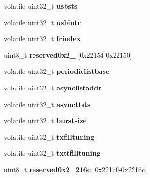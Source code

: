 \begin{DoxyCompactItemize}
volatile uint32\+\_\+t {\bfseries usbsts}
\item 
\mbox{\label{structm83xxUSB__MPHRegisters___aa40fd346ef2c84c0105138f00020142f}} 
volatile uint32\+\_\+t {\bfseries usbintr}
\item 
\mbox{\label{structm83xxUSB__MPHRegisters___a0925a3b8d3aa6941909ec92b1c290482}} 
volatile uint32\+\_\+t {\bfseries frindex}
\item 
\mbox{\label{structm83xxUSB__MPHRegisters___a0333be2defb4c470a48b82ab8dc39a19}} 
uint8\+\_\+t {\bfseries reserved0x2\+\_} \mbox{[}0x22154-\/0x22150\mbox{]}
\item 
\mbox{\label{structm83xxUSB__MPHRegisters___a9642fd5bbe981586fe576dc9b44e299c}} 
volatile uint32\+\_\+t {\bfseries periodiclistbase}
\item 
\mbox{\label{structm83xxUSB__MPHRegisters___ae2a682109aa03a91ac9bcbf3357b16f9}} 
volatile uint32\+\_\+t {\bfseries asynclistaddr}
\item 
\mbox{\label{structm83xxUSB__MPHRegisters___a570808c809a8ab45852a6d643c5ee248}} 
volatile uint32\+\_\+t {\bfseries asyncttsts}
\item 
\mbox{\label{structm83xxUSB__MPHRegisters___a130a21492a0b9117d515d3b1106c3e9d}} 
volatile uint32\+\_\+t {\bfseries burstsize}
\item 
\mbox{\label{structm83xxUSB__MPHRegisters___a445622cebf79ec413521493b7e080e45}} 
volatile uint32\+\_\+t {\bfseries txfilltuning}
\item 
\mbox{\label{structm83xxUSB__MPHRegisters___abff66fbbbd3c0e66ec72c68053d20e3f}} 
volatile uint32\+\_\+t {\bfseries txttfilltuning}
\item 
\mbox{\label{structm83xxUSB__MPHRegisters___a537b0170160c58666c2e817cf896ecc4}} 
uint8\+\_\+t {\bfseries reserved0x2\+\_\+216c} \mbox{[}0x22170-\/0x2216c\mbox{]}

\end{DoxyCompactItemize}
